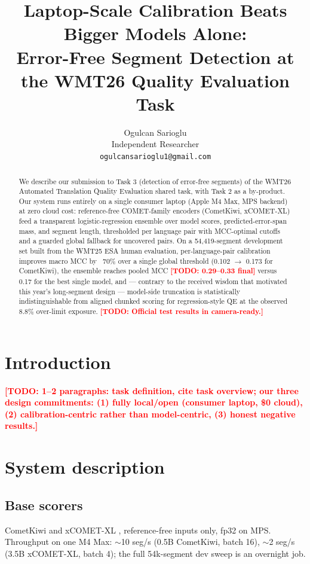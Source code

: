 \documentclass[11pt]{article}
\title{Laptop-Scale Calibration Beats Bigger Models Alone:\\
Error-Free Segment Detection at the WMT26 Quality Evaluation Task}
\author{Ogulcan Sarioglu \\
  Independent Researcher \\
  \texttt{ogulcansarioglu1@gmail.com}}
\newcommand{\todo}[1]{\textbf{\textcolor{red}{[TODO: #1]}}}
\begin{document}
\maketitle

\begin{abstract}
We describe our submission to Task 3 (detection of error-free segments) of
the WMT26 Automated Translation Quality Evaluation shared task, with Task 2
as a by-product. Our system runs entirely on a single consumer laptop
(Apple M4 Max, MPS backend) at zero cloud cost: reference-free COMET-family
encoders (CometKiwi, xCOMET-XL) feed a transparent logistic-regression
ensemble over model scores, predicted-error-span mass, and segment length,
thresholded per language pair with MCC-optimal cutoffs and a guarded global
fallback for uncovered pairs. On a 54{,}419-segment development set built
from the WMT25 ESA human evaluation, per-language-pair calibration improves
macro MCC by ~70\% over a single global threshold (0.102 $\to$ 0.173 for
CometKiwi), the ensemble reaches pooled MCC \todo{0.29--0.33 final} versus
0.17 for the best single model, and — contrary to the received wisdom that
motivated this year's long-segment design — model-side truncation is
statistically indistinguishable from aligned chunked scoring for
regression-style QE at the observed 8.8\% over-limit exposure.
\todo{Official test results in camera-ready.}
\end{abstract}

\section{Introduction}
\todo{1--2 paragraphs: task definition, cite task overview; our three design
commitments: (1) fully local/open (consumer laptop, \$0 cloud), (2)
calibration-centric rather than model-centric, (3) honest negative results.}

\section{System description}
\subsection{Base scorers}
CometKiwi \cite{rei-etal-2022-cometkiwi} and xCOMET-XL
\cite{guerreiro-etal-2024-xcomet}, reference-free inputs only, fp32 on MPS.
Throughput on one M4 Max: $\sim$10 seg/s (0.5B CometKiwi, batch 16),
$\sim$2 seg/s (3.5B xCOMET-XL, batch 4); the full 54k-segment dev sweep is
an overnight job.
\end{document}
